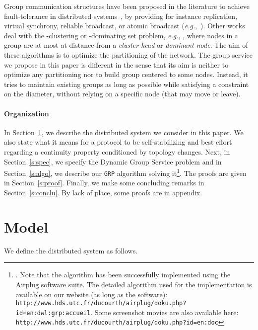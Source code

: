 \documentclass[11pt,english]{article}
\newcommand{\Latin}[1]{\textit{#1}}
\newcommand{\eg}{\Latin{e.g.},\xspace}
\begin{document}
Group communication structures have been proposed in the literature to achieve
fault-tolerance in distributed systems~\cite{ACM93}, by providing for instance
replication, virtual synchrony, reliable broadcast, or atomic broadcast
(\emph{e.g.},~\cite{S90,GS97}).
Other works deal with the -clustering or -dominating set problem, \eg
\cite{APHV00,CKV01,Demirbas06,Johnen09,KM06c,KP98,PB04}, where nodes in a group are at
most at distance  from a \emph{cluster-head} or \emph{dominant node}. The aim
of these algorithms is to optimize the partitioning of the network.
The group service we propose in this paper is different in the sense that its aim is neither to
optimize any partitioning nor to build group centered to some nodes. Instead, it
tries to maintain existing groups as long as possible while satisfying a
constraint on the diameter, without relying on a specific node (that may move or
leave).


\paragraph{Organization}
In Section~\ref{s:model}, we describe the distributed system we consider in this
paper. We also state what it means for a protocol to be self-stabilizing and
best effort regarding a continuity property conditioned by topology changes.
Next, in Section~\ref{s:spec}, we specify the Dynamic Group Service problem and
in Section~\ref{s:algo}, we describe our \texttt{GRP} algorithm solving it\footnote{\label{refonline}.  Note that the algorithm has been successfully implemented using the
  Airplug software suite. The detailed algorithm used for the implementation is
  available on our website (as long as the software):\newline \noindent
{\tt http://www.hds.utc.fr/ducourth/airplug/doku.php?id=en:dwl:grp:accueil}.
Some screenshot movies are also available here:\newline \noindent
{\tt http://www.hds.utc.fr/ducourth/airplug/doku.php?id=en:doc}
}.
The proofs are given in Section~\ref{s:proof}. Finally, we make some
concluding remarks in Section~\ref{s:conclu}.
By lack of place, some proofs are in appendix.





\section{Model}\label{s:model}

We define the distributed system  as follows.
\end{document}
